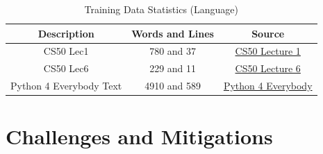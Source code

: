 \documentclass[12pt]{scrreprt}
\begin{document}
\begin{table}[h]
    \centering
    \begin{tabular}{|c|c|c|}
        \hline
        \textbf{Description} & \textbf{Words and Lines} & Source \\
        \hline
            
        CS50 Lec1 & 780 and 37 & \href{https://cs50.harvard.edu/college/2023/spring/notes/1/}{CS50 Lecture 1} \\
        \hline
        CS50 Lec6 & 229 and 11 & \href{https://cs50.harvard.edu/x/2023/notes/6/}{CS50 Lecture 6} \\
        \hline
        Python 4 Everybody Text & 4910 and 589 & \href{https://www.py4e.com/code3/intro.txt}{Python 4 Everybody} \\
        \hline

    \end{tabular}
    \caption{Training Data Statistics (Language)}
    \label{tab:training-data}
\end{table}





\section{Challenges and Mitigations}
\end{document}

